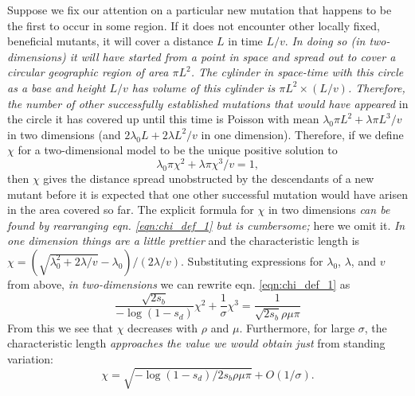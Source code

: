 \documentclass{article}
\newcommand{\gc}[1]{{\it\color{blue}#1}}
\begin{document}
Suppose we fix our attention on a particular new mutation that happens to be the first to occur in some region.
If it does not encounter other locally fixed, beneficial mutants,
it will cover a distance $L$ in time $L/v$. \gc{In doing so (in two-dimensions) it will have
started from a point in space and spread out to cover a circular geographic region of area $\pi L^2$.
The cylinder in space-time with this circle as a base and
height $L/v$ has volume of this cylinder is $\pi L^2 \times (L/v)$.
Therefore, the number of other successfully established mutations that
would have appeared} in the circle it has covered up until this time is Poisson with mean
$\lambda_0 \pi L^2 + \lambda \pi L^3 /v$ in two dimensions
(and $2 \lambda_0 L + 2 \lambda L^2 /v$ in one dimension).
Therefore, if we define $\chi$ for a two-dimensional model to be the unique positive solution to
\begin{equation} \label{eqn:chi_def_1}
    \lambda_0 \pi \chi^2 + \lambda \pi \chi^3 /v = 1,
\end{equation}
then $\chi$ gives the distance spread unobstructed by the descendants of a new mutant
before it is expected that one other successful mutation would have arisen in the area covered so far.
The explicit formula for $\chi$ in two dimensions \gc{can be found by
rearranging eqn. \eqref{eqn:chi_def_1} but is cumbersome;} here we omit
it. \gc{In one dimension things are a little prettier} and the characteristic length is $\chi = ( \sqrt{\lambda_0^2 + 2 \lambda/v} - \lambda_0 )/( 2 \lambda / v )$.
Substituting expressions for $\lambda_0$, $\lambda$, and $v$ from above,
\gc{in two-dimensions} we can rewrite eqn. \eqref{eqn:chi_def_1} as
\begin{equation} \label{eqn:defines_chi}
   \frac{\sqrt{2s_b} }{-\log(1-s_d) } \chi^2 + \frac{1}{\sigma} \chi^3 = \frac{1}{\sqrt{2s_b} \rho\mu\pi}
\end{equation}
From this we see that $\chi$ decreases with $\rho$ and $\mu$.
Furthermore, for large $\sigma$, the characteristic length \gc{approaches
the value we would obtain just} from standing variation:
\begin{equation} \label{eqn:chi_standing}
\chi = \sqrt{ -\log(1-s_d) / 2 s_b \rho \mu \pi } + O(1/\sigma).
\end{equation}
\end{document}
